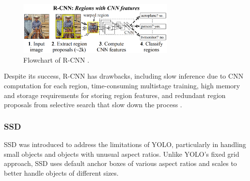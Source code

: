 \begin{figure}[H] %
    \centering
    \includegraphics[width=0.7\textwidth]{chapters/chapter1/images/Figure17.png}
    \caption{Flowchart of R-CNN \parencite{zhao2019objectdetection}.}
    \label{fig:figure17}
\end{figure}

Despite its success, R-CNN has drawbacks, including slow inference due to CNN computation for each region, time-consuming multistage training, high memory and storage requirements for storing region features, and redundant region proposals from selective search that slow down the process \parencite{zhao2019objectdetection}.






\subsubsection{SSD}
SSD was introduced to address the limitations of YOLO, particularly in handling small objects and objects with unusual aspect ratios. Unlike YOLO's fixed grid approach, SSD uses default anchor boxes of various aspect ratios and scales to better handle objects of different sizes.

